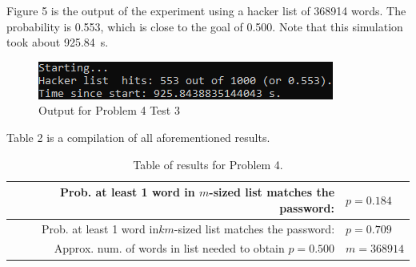 \documentclass{article}
\begin{document}
Figure 5 is the output of the experiment using a hacker
list of \num{368914} words. The probability is \num{0.553},
which is close to the goal of \num{0.500}.
Note that this simulation took
about \SI{925.84}{s}.

\begin{figure}[H]
    \centering
    \includegraphics{Images/hacker3}
    \caption{Output for Problem 4 Test 3}
    \label{prob4:test3}
\end{figure}

Table 2 is a compilation of all aforementioned results.

\begin{table}[H]
    \centering\begin{tabular}{| r | l |}
        \hline
        Prob. at least 1 word in \(m\)-sized list matches the password: & \(p = 0.184\) \\ \hline
        Prob. at least 1 word in\(km\)-sized list matches the password: & \(p = 0.709\) \\ \hline
        Approx. num. of words in list needed to obtain  \(p = 0.500\) & \(m = \num{368914}\) \\ \hline
    \end{tabular}
    \caption{Table of results for Problem 4.}
    \label{prob4:table}
\end{table}
\end{document}
